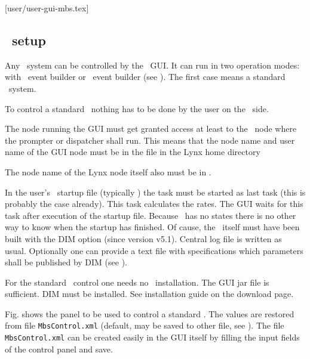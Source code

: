 [user/user-gui-mbs.tex]
\label{user-gui-mbs-chapter}
\subsection[MBS setup]{\mbs\ setup}
Any \mbs\ system can be controlled by the \dabc\ GUI.
It can run in two operation modes: with \mbs\ event builder or \dabc\ event builder
(see ).
The first case means a standard \mbs\ system.

To control a standard \mbs\ nothing has to be done by the user on the \mbs\ side.\\
\bbul
\item The node running the GUI must get granted  access at least to the
\mbs\ node where the prompter or dispatcher shall run. This means that the node name and user name of the GUI node must be in 
the  file in the Lynx home directory 
\item The node name of the Lynx node itself also must be in .
\item In the user's \mbs\ startup file (typically ) the  task must be started as last task (this is probably the case already).
This task calculates the rates. The GUI waits for this task after execution of
the startup file. Because \mbs\ has no states there is no other way to
know when the startup has finished.
\ebul
Of cause, the \mbs\ itself must have been built with the DIM option (since version v5.1).
Central log file is written as usual.
Optionally one can provide a text file with specifications which parameters
shall be published by DIM (see ).

For the standard \mbs\ control one needs no \dabc\ installation.
The GUI jar file is sufficient. DIM must be installed.
See installation guide on the download page.

Fig.  shows the panel to be used to control
a standard \mbs.
The values are restored from file {\tt MbsControl.xml} (default, may be saved to other file,
see ).
The file {\tt MbsControl.xml} can be created easily in the GUI itself
by filling the input fields of the control panel and save.

